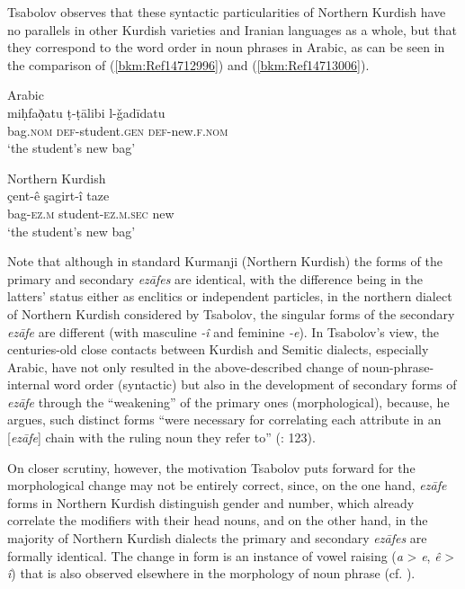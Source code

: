 \documentclass[output=paper]{langsci/langscibook}
\begin{document}

Tsabolov observes that these syntactic particularities of Northern Kurdish have no parallels in other Kurdish varieties and Iranian languages as a whole, but that they correspond to the word order in noun phrases in Arabic, as can be seen in the comparison of (\ref{bkm:Ref14712996}) and (\ref{bkm:Ref14713006}). 

\ea\label{bkm:Ref14712996}\label{bkm:Ref14771925}Arabic \citep[123]{Tsabolov1994}\\
\gll miḥfað̣atu ṭ-ṭālibi l-ǧadīdatu\\
     bag\textsc{.nom} \textsc{def}{}-student.\textsc{gen} \textsc{def}{}-new.\textsc{f.nom} \\
\glt ‘the student’s new bag’
\z

\ea\label{bkm:Ref14713006}Northern Kurdish \citep[123]{Tsabolov1994}\\
\gll çent-ê şagirt-î taze\\
     bag-\textsc{ez.m} student-\textsc{ez.m.sec} new\\
\glt ‘the student’s new bag’
\z

Note that although in standard Kurmanji (Northern Kurdish) the forms of the primary and secondary \textit{ezāfes} are identical, with the difference being in the latters’ status either as enclitics or independent particles, in the northern dialect of Northern Kurdish considered by Tsabolov, the singular forms of the secondary \textit{ezāfe} are different (with masculine \textit{{}-î} and feminine \textit{{}-e}). In Tsabolov’s view, the centuries-old close contacts between Kurdish and Semitic dialects, especially Arabic, have not only resulted in the above-described change of noun-phrase-internal word order (syntactic) but also in the development of secondary forms of \textit{ezāfe} through the “weakening” of the primary ones (morphological), because, he argues, such distinct forms “were necessary for correlating each attribute in an [\textit{ezāfe}] chain with the ruling noun they refer to” (\citeyear{Tsabolov1994}: 123). 

On closer scrutiny, however, the motivation Tsabolov puts forward for the morphological change may not be entirely correct, since, on the one hand, \textit{ezāfe} forms in Northern Kurdish distinguish gender and number, which already correlate the modifiers with their head nouns, and on the other hand, in the majority of Northern Kurdish dialects the primary and secondary \textit{ezāfes} are formally identical. The change in form is an instance of vowel raising (\textit{a} > \textit{e}, \textit{ê} > \textit{î}) that is also observed elsewhere in the morphology of noun phrase (cf. \citealt{HaigÖpengin2018}). 
\end{document}

